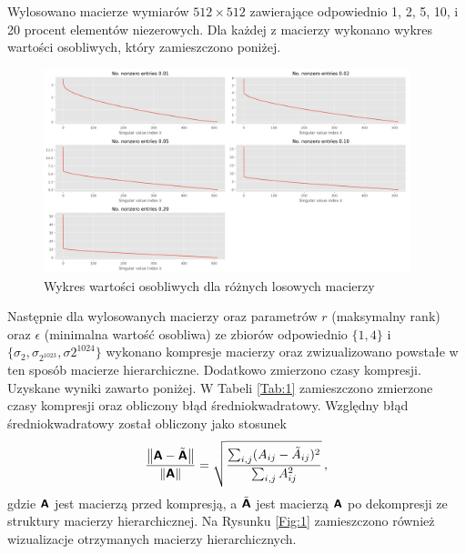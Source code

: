 \documentclass{../myclass}
\begin{document}
Wylosowano macierze wymiarów \(512 \times 512\) zawierające odpowiednio 1, 2, 5, 10, i 20 procent
elementów niezerowych. Dla każdej z macierzy wykonano wykres wartości osobliwych, który zamieszczono
poniżej.

\begin{figure}[ht]
    \centering
    \includegraphics[width=0.95\textwidth]{singular_values.png}
    \caption{Wykres wartości osobliwych dla różnych losowych macierzy}    
\end{figure}

Następnie dla wylosowanych macierzy oraz parametrów \(r\) (maksymalny rank) oraz \(\epsilon\)
(minimalna wartość osobliwa) ze zbiorów odpowiednio \(\{1,4\}\) i \(\{\sigma_2, \sigma_{2^{1023}},
\sigma{2^{1024}}\}\) wykonano kompresje macierzy oraz zwizualizowano powstałe w ten sposób macierze
hierarchiczne. Dodatkowo zmierzono czasy kompresji. Uzyskane wyniki zawarto poniżej. W Tabeli
\ref{Tab:1} zamieszczono zmierzone czasy kompresji oraz obliczony błąd średniokwadratowy. Względny
błąd średniokwadratowy został obliczony jako stosunek
\begin{equation}
    \frac{\norm{\boldsymbol{\mathsf{A}} - \tilde{\boldsymbol{\mathsf{A}}}}}{\norm{\boldsymbol{\mathsf{A}}}} = \sqrt{\frac{\sum_{i,j}(A_{ij} - \tilde{A}_{ij})^2}{\sum_{i,j}A_{ij}^2}}\,,
\end{equation}
gdzie \(\boldsymbol{\mathsf{A}}\) jest macierzą przed kompresją, a \(\tilde{\boldsymbol{\mathsf{A}}}\) jest macierzą \(\boldsymbol{\mathsf{A}}\)
po dekompresji ze struktury macierzy hierarchicznej. Na Rysunku \ref{Fig:1} zamieszczono również
wizualizacje otrzymanych macierzy hierarchicznych.
\end{document}
